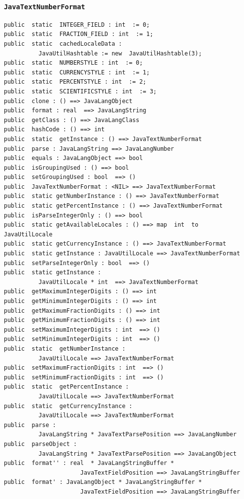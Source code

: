 \documentclass[\pformat,12pt]{article}
\begin{document}
\subsubsection{\texttt{JavaTextNumberFormat}}
\begin{small}
\begin{verbatim}
public  static  INTEGER_FIELD : int  := 0;
public  static  FRACTION_FIELD : int  := 1;
public  static  cachedLocaleData : 
          JavaUtilHashtable := new  JavaUtilHashtable(3);
public  static  NUMBERSTYLE : int  := 0;
public  static  CURRENCYSTYLE : int  := 1;
public  static  PERCENTSTYLE : int  := 2;
public  static  SCIENTIFICSTYLE : int  := 3;
public  clone : () ==> JavaLangObject
public  format : real  ==> JavaLangString
public  getClass : () ==> JavaLangClass
public  hashCode : () ==> int
public  static  getInstance : () ==> JavaTextNumberFormat
public  parse : JavaLangString ==> JavaLangNumber
public  equals : JavaLangObject ==> bool
public  isGroupingUsed : () ==> bool
public  setGroupingUsed : bool  ==> ()
public  JavaTextNumberFormat : <NIL> ==> JavaTextNumberFormat
public  static getNumberInstance : () ==> JavaTextNumberFormat
public  static getPercentInstance : () ==> JavaTextNumberFormat
public  isParseIntegerOnly : () ==> bool
public  static getAvailableLocales : () ==> map  int  to  JavaUtilLocale
public  static getCurrencyInstance : () ==> JavaTextNumberFormat
public  static getInstance : JavaUtilLocale ==> JavaTextNumberFormat
public  setParseIntegerOnly : bool  ==> ()
public  static getInstance : 
          JavaUtilLocale * int  ==> JavaTextNumberFormat
public  getMaximumIntegerDigits : () ==> int
public  getMinimumIntegerDigits : () ==> int
public  getMaximumFractionDigits : () ==> int
public  getMinimumFractionDigits : () ==> int
public  setMaximumIntegerDigits : int  ==> ()
public  setMinimumIntegerDigits : int  ==> ()
public  static  getNumberInstance : 
          JavaUtilLocale ==> JavaTextNumberFormat
public  setMaximumFractionDigits : int  ==> ()
public  setMinimumFractionDigits : int  ==> ()
public  static  getPercentInstance : 
          JavaUtilLocale ==> JavaTextNumberFormat
public  static  getCurrencyInstance : 
          JavaUtilLocale ==> JavaTextNumberFormat
public  parse : 
          JavaLangString * JavaTextParsePosition ==> JavaLangNumber
public  parseObject : 
          JavaLangString * JavaTextParsePosition ==> JavaLangObject
public  format'' : real  * JavaLangStringBuffer * 
                      JavaTextFieldPosition ==> JavaLangStringBuffer
public  format' : JavaLangObject * JavaLangStringBuffer * 
                      JavaTextFieldPosition ==> JavaLangStringBuffer
\end{verbatim}
\end{small}
\end{document}
